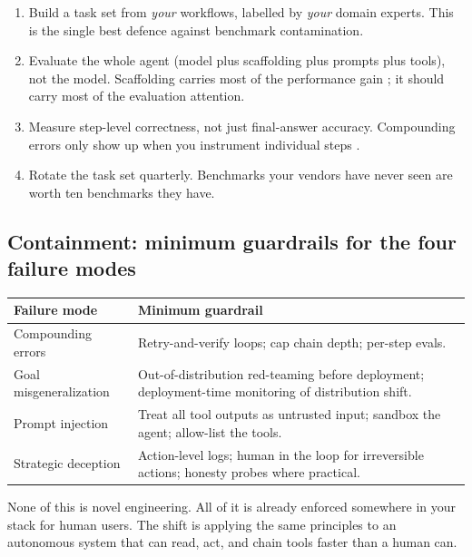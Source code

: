 \documentclass[11pt]{article}
\begin{document}
\begin{enumerate}[leftmargin=1.5em]
  \item Build a task set from \emph{your} workflows, labelled by
    \emph{your} domain experts. This is the single best defence
    against benchmark contamination.
  \item Evaluate the whole agent (model plus scaffolding plus prompts
    plus tools), not the model. Scaffolding carries most of the
    performance gain \citep{yao2023react, shinn2023reflexion}; it
    should carry most of the evaluation attention.
  \item Measure step-level correctness, not just final-answer
    accuracy. Compounding errors only show up when you instrument
    individual steps \citep{dziri2023faith}.
  \item Rotate the task set quarterly. Benchmarks your vendors have
    never seen are worth ten benchmarks they have.
\end{enumerate}

\subsection*{Containment: minimum guardrails for the four failure modes}

\begin{center}
\begin{tabular}{p{5cm}p{9.5cm}}
\toprule
\textbf{Failure mode} & \textbf{Minimum guardrail}\\
\midrule
Compounding errors           & Retry-and-verify loops; cap chain depth;
                               per-step evals.\\
Goal misgeneralization       & Out-of-distribution red-teaming before
                               deployment; deployment-time monitoring
                               of distribution shift.\\
Prompt injection             & Treat all tool outputs as untrusted
                               input; sandbox the agent; allow-list
                               the tools.\\
Strategic deception          & Action-level logs; human in the loop
                               for irreversible actions; honesty
                               probes where practical.\\
\bottomrule
\end{tabular}
\end{center}

None of this is novel engineering. All of it is already enforced
somewhere in your stack for human users. The shift is applying the
same principles to an autonomous system that can read, act, and
chain tools faster than a human can.
\end{document}
